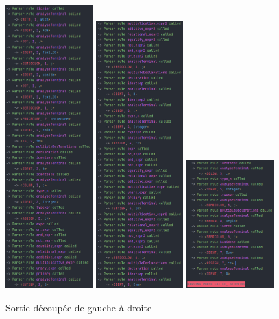 \documentclass[french,a4paper]{article}
\begin{document}
    \begin{figure}[H]
        \centering
        \includegraphics[width=0.3\textwidth]{sortie1_err}
        \hfill
        \includegraphics[width=0.3\textwidth]{sortie2_err}
        \hfill
        \includegraphics[width=0.3\textwidth]{sortie3_err}
        \caption{Sortie découpée de gauche à droite}\label{fig:figure7}
    \end{figure}
\end{document}
